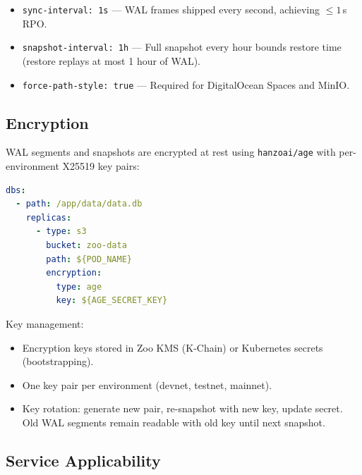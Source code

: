 \documentclass[twocolumn,11pt]{article}
\begin{document}
\begin{itemize}
\item \texttt{sync-interval: 1s} --- WAL frames shipped every
  second, achieving $\leq 1$\,s RPO.
\item \texttt{snapshot-interval: 1h} --- Full snapshot every hour
  bounds restore time (restore replays at most 1 hour of WAL).
\item \texttt{force-path-style: true} --- Required for
  DigitalOcean Spaces and MinIO.
\end{itemize}

\subsection{Encryption}

WAL segments and snapshots are encrypted at rest using
\texttt{hanzoai/age} with per-environment X25519 key pairs:

\begin{lstlisting}[language=yaml,caption={Encryption configuration}]
dbs:
  - path: /app/data/data.db
    replicas:
      - type: s3
        bucket: zoo-data
        path: ${POD_NAME}
        encryption:
          type: age
          key: ${AGE_SECRET_KEY}
\end{lstlisting}

Key management:
\begin{itemize}
\item Encryption keys stored in Zoo KMS (K-Chain) or
  Kubernetes secrets (bootstrapping).
\item One key pair per environment (devnet, testnet, mainnet).
\item Key rotation: generate new pair, re-snapshot with new key,
  update secret.  Old WAL segments remain readable with old key
  until next snapshot.
\end{itemize}

\subsection{Service Applicability}
\end{document}
